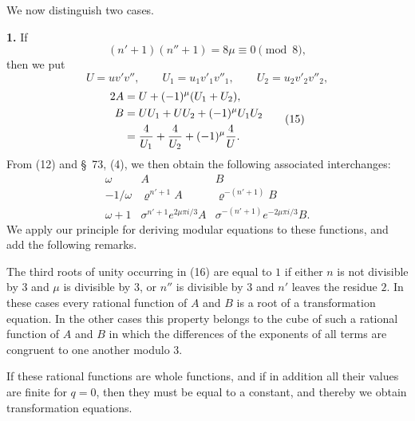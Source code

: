 \documentclass[11pt]{article}
\begin{document}
We now distinguish two cases.

\noindent\textbf{1.} If
\begin{equation}
 (n'+1)(n''+1)=8\mu\equiv0\pmod 8,
\tag{13}
\end{equation}
then we put
\begin{equation}
 U=uv'v'',
 \qquad U_1=u_1v'_1v''_1,
 \qquad U_2=u_2v'_2v''_2,
\tag{14}
\end{equation}
\begin{equation}
\begin{aligned}
2A&=U+(-1)^\mu(U_1+U_2),\\
B&=UU_1+UU_2+(-1)^\mu U_1U_2\\
&={4\over U_1}+{4\over U_2}+(-1)^\mu{4\over U}.
\end{aligned}
\tag{15}
\end{equation}
From (12) and \S~73, (4), we then obtain the following associated interchanges:
\begin{equation}
\begin{array}{c|cc}
\omega&A&B\\[0.2em]
-1/\omega&\varrho^{n'+1}A&\varrho^{-(n'+1)}B\\[0.2em]
\omega+1&\sigma^{n'+1}e^{2\mu\pi i/3}A&\sigma^{-(n'+1)}e^{-2\mu\pi i/3}B.
\end{array}
\tag{16}
\end{equation}
We apply our principle for deriving modular equations to these functions, and add the following remarks.

The third roots of unity occurring in (16) are equal to $1$ if either $n$ is not divisible by $3$ and $\mu$ is divisible by $3$, or $n''$ is divisible by $3$ and $n'$ leaves the residue $2$. In these cases every rational function of $A$ and $B$ is a root of a transformation equation. In the other cases this property belongs to the cube of such a rational function of $A$ and $B$ in which the differences of the exponents of all terms are congruent to one another modulo $3$.

If these rational functions are whole functions, and if in addition all their values are finite for $q=0$, then they must be equal to a constant, and thereby we obtain transformation equations.
\end{document}
